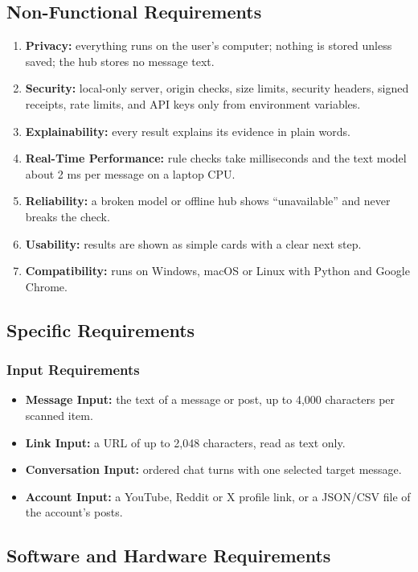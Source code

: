 \subsection{Non-Functional Requirements}
\begin{enumerate}
\item \textbf{Privacy:} everything runs on the user's computer; nothing is stored unless saved; the hub stores no message text.
\item \textbf{Security:} local-only server, origin checks, size limits, security headers, signed receipts, rate limits, and API keys only from environment variables.
\item \textbf{Explainability:} every result explains its evidence in plain words.
\item \textbf{Real-Time Performance:} rule checks take milliseconds and the text model about 2 ms per message on a laptop CPU.
\item \textbf{Reliability:} a broken model or offline hub shows ``unavailable'' and never breaks the check.
\item \textbf{Usability:} results are shown as simple cards with a clear next step.
\item \textbf{Compatibility:} runs on Windows, macOS or Linux with Python and Google Chrome.
\end{enumerate}

\subsection{Specific Requirements}
\subsubsection*{Input Requirements}
\begin{itemize}
\item \textbf{Message Input:} the text of a message or post, up to 4,000 characters per scanned item.
\item \textbf{Link Input:} a URL of up to 2,048 characters, read as text only.
\item \textbf{Conversation Input:} ordered chat turns with one selected target message.
\item \textbf{Account Input:} a YouTube, Reddit or X profile link, or a JSON/CSV file of the account's posts.
\end{itemize}

\subsection{Software and Hardware Requirements}
